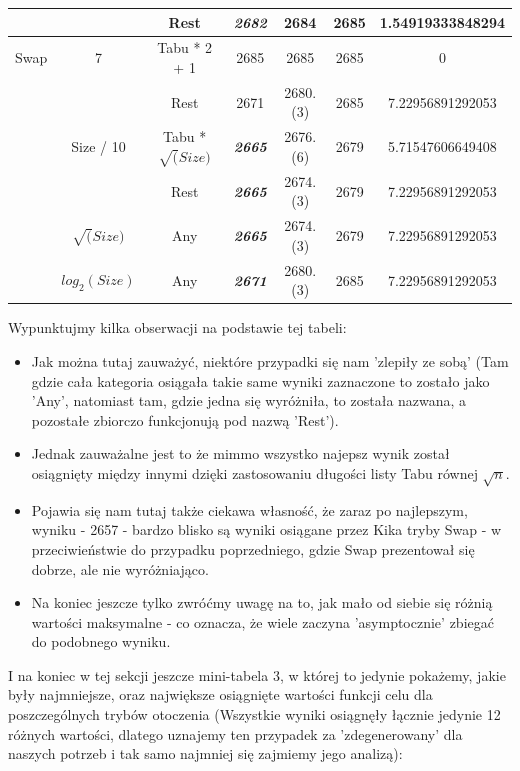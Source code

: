 \documentclass{article}
\begin{document}
\begin{table}[h!]
\begin{tabular}{c|c|c||c|c|c|c}
 &  & Rest &  \textbf{\textit{2682}} & 2684 & 2685 & 1.54919333848294 \\
\hline
Swap & 7 & Tabu * 2 + 1 & 2685 & 2685 & 2685 & 0 \\
 &  & Rest & 2671 & 2680.(3) & 2685 & 7.22956891292053 \\
\cline{2-7}
 & Size / 10 & Tabu * $\sqrt(Size)$ &  \textbf{\textit{2665}} & 2676.(6) & 2679 & 5.71547606649408 \\
 &  & Rest &  \textbf{\textit{2665}} & 2674.(3) & 2679 & 7.22956891292053 \\
\cline{2-7}
 & $\sqrt(Size)$ & Any &  \textbf{\textit{2665}} & 2674.(3) & 2679 & 7.22956891292053 \\
\cline{2-7}
 & $log_2(Size)$ & Any &  \textbf{\textit{2671}} & 2680.(3) & 2685 & 7.22956891292053 \\
\end{tabular}
\end{table}

Wypunktujmy kilka obserwacji na podstawie tej tabeli:
\begin{itemize}
	\item Jak można tutaj zauważyć, niektóre przypadki się nam 'zlepiły ze sobą' (Tam gdzie cała kategoria osiągała takie same wyniki zaznaczone to zostało jako 'Any', natomiast tam, gdzie jedna się wyróżniła, to została nazwana, a pozostałe zbiorczo funkcjonują pod nazwą 'Rest').
	\item Jednak zauważalne jest to że mimmo wszystko najepsz wynik został osiągnięty między innymi dzięki zastosowaniu długości listy Tabu równej $\sqrt{n}$.
	\item Pojawia się nam tutaj także ciekawa własność, że zaraz po najlepszym, wyniku - 2657 - bardzo blisko są wyniki osiągane przez Kika tryby Swap - w przeciwieństwie do przypadku poprzedniego, gdzie Swap prezentował się dobrze, ale nie wyróżniająco.
	\item Na koniec jeszcze tylko zwróćmy uwagę na to, jak mało od siebie się różnią wartości maksymalne - co oznacza, że wiele zaczyna 'asymptocznie' zbiegać do podobnego wyniku.
\end{itemize}

I na koniec w tej sekcji jeszcze mini-tabela 3, w której to jedynie pokażemy, jakie były najmniejsze, oraz największe osiągnięte wartości funkcji celu dla poszczególnych trybów otoczenia (Wszystkie wyniki osiągnęły łącznie jedynie 12 różnych wartości, dlatego uznajemy ten przypadek za 'zdegenerowany' dla naszych potrzeb i tak samo najmniej się zajmiemy jego analizą):
\end{document}
